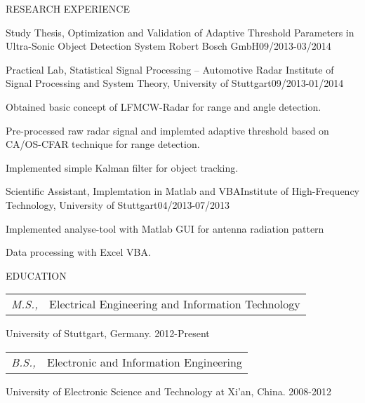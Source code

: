 \documentclass{resume} %
\begin{document}
\begin{rSection}{RESEARCH  EXPERIENCE}
\begin{rSubsection}{Study Thesis, Optimization and Validation of Adaptive Threshold Parameters in Ultra-Sonic Object Detection System 
}{}{Robert Bosch GmbH}{09/2013-03/2014}
\end{rSubsection}


\begin{rSubsection}{Practical Lab, Statistical Signal Processing – Automotive Radar
}{}{Institute of Signal Processing and System Theory, University of Stuttgart}{09/2013-01/2014}

\item Obtained basic concept of LFMCW-Radar for range and angle detection.
\item Pre-processed raw radar signal and implemted adaptive threshold based on CA/OS-CFAR technique for range detection.
\item Implemented simple Kalman filter for object tracking. 


\end{rSubsection}

\begin{rSubsection}{Scientific Assistant, Implemtation in Matlab and VBA}{}{Institute of High-Frequency Technology, University of Stuttgart}{04/2013-07/2013}

\item Implemented analyse-tool with Matlab GUI for antenna radiation pattern 
\item Data processing with Excel VBA.

\end{rSubsection}
\end{rSection}


\begin{rSection}{EDUCATION}
\begin{tabular}{l l}
 
{\sl M.S.,} & Electrical Engineering and Information Technology\\
\end{tabular}

University of Stuttgart, Germany. \hfill 2012-Present \\

\begin{tabular}{l l}
{\sl B.S.,} & Electronic and Information Engineering\\
\end{tabular}

University of Electronic Science and Technology at Xi'an, China. \hfill  2008-2012\\



\end{rSection}
\end{document}
